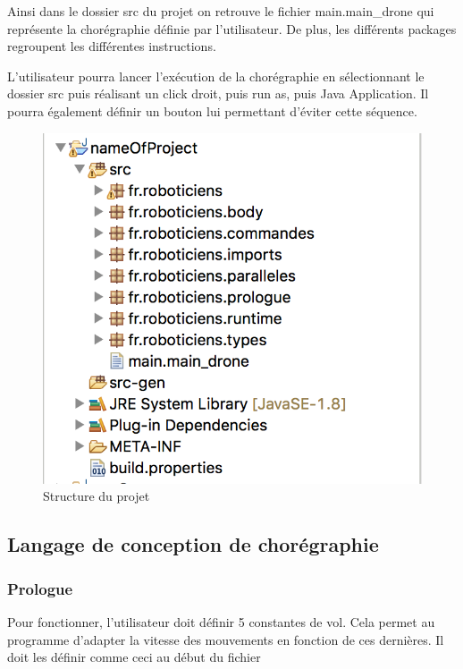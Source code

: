 \documentclass[12pt]{article}
\begin{document}
        Ainsi dans le dossier src du projet on retrouve le fichier main.main\_drone qui représente la chorégraphie définie par l'utilisateur. De plus, les différents packages regroupent les différentes instructions.
        
        L'utilisateur pourra lancer l'exécution de la chorégraphie en sélectionnant le dossier src puis réalisant un click droit, puis run as, puis Java Application. Il pourra également définir un bouton lui permettant d'éviter cette séquence.        
        \begin{figure}[!h]
        \centering
        \includegraphics[scale=0.50]{08.png}
        \caption{Structure du projet}
        \end{figure}
        
        \subsection{Langage de conception de chorégraphie}
        		\subsubsection{Prologue}
			Pour fonctionner, l'utilisateur doit définir 5 constantes de vol.
			Cela permet au programme d'adapter la vitesse des mouvements en fonction de ces dernières.
			Il doit les définir comme ceci au début du fichier \newline
\end{document}
